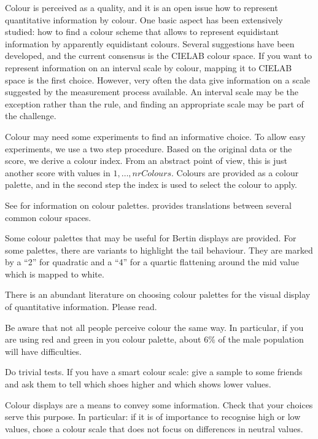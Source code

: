 \documentclass[nogin, dvips,12pt,a4paper,twoside]{amsart}
\begin{document}
Colour is perceived as a quality, and it is an open issue how to represent quantitative information by colour. One basic aspect has been extensively studied: how to find a colour scheme that allows to represent equidistant information by apparently equidistant colours. Several suggestions have been developed, and the current consensus is  the CIELAB colour space. If you want to represent information on an interval scale by colour, mapping it to CIELAB space is the first choice. However, very often the data give information on a scale suggested by the measurement process available. An interval scale may be the exception rather than the rule, and finding an appropriate scale may be part of the challenge.

Colour may need some experiments to find an informative choice. To allow easy experiments, we use a two step procedure. Based on the original data or the score, we derive a colour index. From an abstract point of view, this is just another score with values in $1, \ldots, nrColours$. Colours are provided as a colour palette, and in the second step the index is used to select the colour to apply. 

See  for information on colour palettes.  provides translations between several common colour spaces.

Some colour palettes that may be useful for Bertin displays are provided. For some palettes, there are variants to highlight the tail behaviour. They are marked by a ``2'' for quadratic and a ``4'' for a quartic flattening around the mid value which is mapped to white.

There is an abundant literature on choosing colour palettes for the visual display of quantitative information. Please read.

Be aware that not all people perceive colour the same way. In particular, if you are using red and green in you colour palette, about 6\% of the male population will have difficulties.

Do trivial tests. If you have a smart colour scale: give a sample to some friends and ask them to tell which shoes higher and which shows lower values.

Colour displays are a means to convey some information. Check that your choices serve this purpose. In particular: if it is of importance to recognise high or low values, chose a colour scale that does not focus on differences in neutral values.

\end{document}
